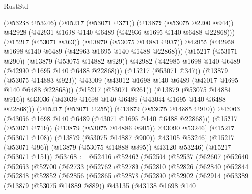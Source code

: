 \begin{lexlean}{RustStd}
\begin{coremodule}
                      (@53238 @53246)
                      (@15217 (@53071 @371))
                      (@13879 (@53075 @2200 @944))
                      @42928
                      (@42931 @1698 @140 @6489 (@42936 @1695 @140 @6488 @22868)))
                    (@15217 (@53071 @363))
                    (@13879 (@53075 @14881 @937))
                    @42955
                    (@42958 @1698 @140 @6489 (@42963 @1695 @140 @6488 @22868)))
                  (@15217 (@53071 @290))
                  (@13879 (@53075 @14882 @929))
                  @42982
                  (@42985 @1698 @140 @6489 (@42990 @1695 @140 @6488 @22868)))
                (@15217 (@53071 @347))
                (@13879 (@53075 @14883 @923))
                @43009
                (@43012 @1698 @140 @6489 (@43017 @1695 @140 @6488 @22868)))
              (@15217 (@53071 @261))
              (@13879 (@53075 @14884 @916))
              @43036
              (@43039 @1698 @140 @6489 (@43044 @1695 @140 @6488 @22868)))
            (@15217 (@53071 @255))
            (@13879 (@53075 @14885 @910))
            @43063
            (@43066 @1698 @140 @6489 (@43071 @1695 @140 @6488 @22868)))
          (@15217 (@53071 @719))
          (@13879 (@53075 @14886 @905))
          @43090
          @53246)
        (@15217 (@53071 @108))
        (@13879 (@53075 @14887 @900))
        @43105
        @53246)
      (@15217 (@53071 @96))
      (@13879 (@53075 @14888 @895))
      @43120
      @53246)
    (@15217 (@53071 @151))
@53468 := @52416
    (@52462
      (@52504
        (@52537
          (@52607
            (@52640
              (@52663
                (@52700
                  (@52733
                    (@52762
                      (@52789
                        (@52810
                          (@52826
                            (@52840
                              (@52844
                                (@52848
                                  (@52852
                                    (@52856
                                      (@52865
                                        (@52878
                                          (@52890
                                            (@52902
                                              (@52914
                                                (@53389
                                                  (@13879 (@53075 @14889 @889))
                                                  @43135
                                                  (@43138
                                                    @1698
                                                    @140

\end{coremodule}
\end{lexlean}
